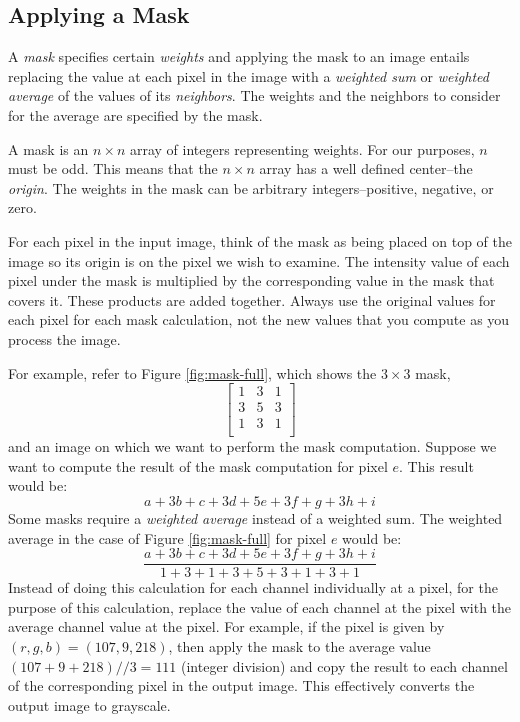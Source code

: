 \documentclass[addpoints]{exam}
\begin{document}
  \subsection{Applying a Mask}

  A \textit{mask} specifies certain \textit{weights} and applying the mask to an image entails replacing the value at each pixel in the image with a \textit{weighted sum} or \textit{weighted average} of the values of its \textit{neighbors}. The weights and the neighbors to consider for the average are specified by the mask.

  A mask is an $n \times n$ array of integers representing weights. For our purposes, $n$ must be odd. This means that the $n \times n$ array has a well defined center--the \textit{origin}. The weights in the mask can be arbitrary integers--positive, negative, or zero.

  For each pixel in the input image, think of the mask as being placed on top of the image so its origin is on the pixel we wish to examine. The intensity value of each pixel under the mask is multiplied by the corresponding value in the mask that covers it. These products are added together. Always use the original values for each pixel for each mask calculation, not the new values that you compute as you process the image.

  For example, refer to Figure \ref{fig:mask-full}, which shows the  $3 \times 3$ mask,
  \[
    \left[
      \begin{array}{ccc}
        1 & 3 & 1\\
        3 & 5 & 3\\
        1 & 3 & 1\\
      \end{array}          
    \right]
  \]
  and an image on which we want to perform the mask computation. Suppose we want to compute the result of the mask computation for pixel $e$. This result would be:
  \[
    a + 3b + c + 3d + 5e + 3f + g + 3h + i
  \]
  Some masks require a \textit{weighted average} instead of a weighted sum. The weighted average in the case of Figure \ref{fig:mask-full} for pixel $e$ would be:
  \[
    \frac{a + 3b + c + 3d + 5e + 3f + g + 3h + i} {1 + 3 + 1 + 3 + 5 + 3 + 1 + 3 + 1}
  \]
  Instead of doing this calculation for each channel individually at a pixel, for the purpose of this calculation, replace the value of each channel at the pixel with the average channel value at the pixel. For example, if the pixel is given by $(r, g, b) = (107, 9, 218)$, then apply the mask to the average value $(107 + 9 + 218)//3 = 111$ (integer division) and copy the result to each channel of the corresponding pixel in the output image. This effectively converts the output image to grayscale.
\end{document}
